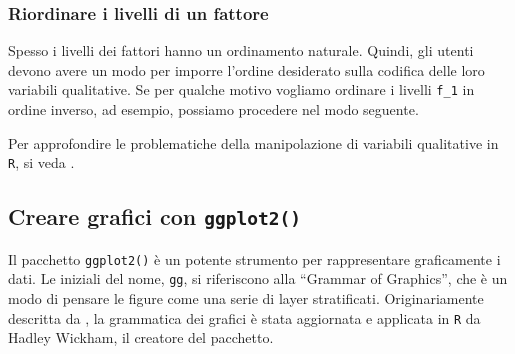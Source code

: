 \documentclass[
  11pt,
]{krantz}
\makeatletter
\newenvironment{Shaded}{\begin{snugshade}}{\end{snugshade}}
\newcommand{\AttributeTok}[1]{\textcolor[rgb]{0.61,0.61,0.61}{#1}}
\newcommand{\CommentTok}[1]{\textcolor[rgb]{0.37,0.37,0.37}{\textit{#1}}}
\newcommand{\FunctionTok}[1]{\textcolor[rgb]{0,0,0}{#1}}
\newcommand{\NormalTok}[1]{#1}
\newcommand{\OtherTok}[1]{\textcolor[rgb]{0.37,0.37,0.37}{#1}}
\newcommand{\SpecialCharTok}[1]{\textcolor[rgb]{0,0,0}{#1}}
\newcommand{\StringTok}[1]{\textcolor[rgb]{0.5,0.5,0.5}{#1}}
\newenvironment{kframe}{%
\medskip{}
\setlength{\fboxsep}{.8em}
 \def\at@end@of@kframe{}%
 \ifinner\ifhmode%
  \def\at@end@of@kframe{\end{minipage}}%
  \begin{minipage}{\columnwidth}%
 \fi\fi%
 \def\FrameCommand##1{\hskip\@totalleftmargin \hskip-\fboxsep
 \colorbox{shadecolor}{##1}\hskip-\fboxsep
     \hskip-\linewidth \hskip-\@totalleftmargin \hskip\columnwidth}%
 \MakeFramed {\advance\hsize-\width
   \@totalleftmargin\z@ \linewidth\hsize
   \@setminipage}}%
 {\par\unskip\endMakeFramed%
 \at@end@of@kframe}
\renewenvironment{Shaded}{\begin{kframe}}{\end{kframe}}
\theoremstyle{definition}
\theoremstyle{definition}
\theoremstyle{definition}
\theoremstyle{definition}
\theoremstyle{remark}
\makeatother
\begin{document}
\hypertarget{riordinare-i-livelli-di-un-fattore}{%
\subsubsection{Riordinare i livelli di un fattore}\label{riordinare-i-livelli-di-un-fattore}}

Spesso i livelli dei fattori hanno un ordinamento naturale. Quindi, gli utenti devono avere un modo per imporre l'ordine desiderato sulla codifica delle loro variabili qualitative. Se per qualche motivo vogliamo ordinare i livelli \texttt{f\_1} in ordine inverso, ad esempio, possiamo procedere nel modo seguente.

\begin{Shaded}
\end{Shaded}

\noindent Per approfondire le problematiche della manipolazione di variabili qualitative in \texttt{R}, si veda \citet{mcnamara2018wrangling}.

\hypertarget{creare-grafici-con-ggplot2}{%
\subsection{\texorpdfstring{Creare grafici con \texttt{ggplot2()}}{Creare grafici con ggplot2()}}\label{creare-grafici-con-ggplot2}}

Il pacchetto \texttt{ggplot2()} è un potente strumento per rappresentare graficamente i dati. Le iniziali del nome, \texttt{gg}, si riferiscono alla ``Grammar of Graphics'', che è un modo di pensare le figure come una serie di layer stratificati. Originariamente descritta da \citet{wilkinson2012grammar}, la grammatica dei grafici è stata aggiornata e applicata in \texttt{R} da Hadley Wickham, il creatore del pacchetto.
\end{document}
